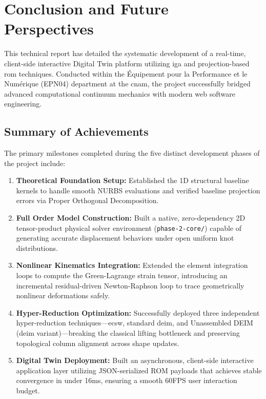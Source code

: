 \section{Conclusion and Future Perspectives}
\label{sec:conclusion}

This technical report has detailed the systematic development of a real-time, client-side interactive Digital Twin platform utilizing \acrlong{iga} and projection-based \acrlong{rom} techniques. Conducted within the Équipement pour la Performance et le Numérique (EPN04) department at the \acrshort{cnam}, the project successfully bridged advanced computational continuum mechanics with modern web software engineering.

\subsection{Summary of Achievements}
The primary milestones completed during the five distinct development phases of the project include:
\begin{enumerate}
    \item \textbf{Theoretical Foundation Setup:} Established the 1D structural baseline kernels to handle smooth NURBS evaluations and verified baseline projection errors via Proper Orthogonal Decomposition.
    \item \textbf{Full Order Model Construction:} Built a native, zero-dependency 2D tensor-product physical solver environment (\texttt{phase-2-core/}) capable of generating accurate displacement behaviors under open uniform knot distributions.
    \item \textbf{Nonlinear Kinematics Integration:} Extended the element integration loops to compute the Green-Lagrange strain tensor, introducing an incremental residual-driven Newton-Raphson loop to trace geometrically nonlinear deformations safely.
    \item \textbf{Hyper-Reduction Optimization:} Successfully deployed three independent hyper-reduction techniques—\acrshort{ecsw}, standard \acrshort{deim}, and Unassembled DEIM (\acrshort{deim} variant)—breaking the classical lifting bottleneck and preserving topological column alignment across shape updates.
    \item \textbf{Digital Twin Deployment:} Built an asynchronous, client-side interactive application layer utilizing JSON-serialized ROM payloads that achieves stable convergence in under 16ms, ensuring a smooth 60FPS user interaction budget.
\end{enumerate}

